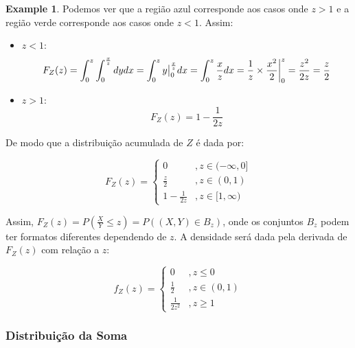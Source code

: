 \documentclass[
]{article}
\providecommand{\tightlist}{%
  \setlength{\itemsep}{0pt}\setlength{\parskip}{0pt}}
\theoremstyle{definition}
\theoremstyle{definition}
\newtheorem{example}{Example}[section]
\theoremstyle{definition}
\theoremstyle{definition}
\theoremstyle{remark}
\begin{document}
\begin{example}
Podemos ver que a região azul corresponde aos casos onde \(z > 1\) e a região verde corresponde aos casos onde \(z < 1\). Assim:

\begin{itemize}
\tightlist
\item
  \(z<1\): \begin{equation*}F_{Z}(z) = \int_{0}^{z}\int_{0}^{\frac{x}{z}}dydx = \int_{0}^{z}y\big{|}_{0}^{\frac{x}{z}}dx = \int_{0}^{z}\frac{x}{z}dx = \frac{1}{z} \times \frac{x^{2}}{2}\bigg{|}_{0}^{z} = \frac{z^{2}}{2z} = \frac{z}{2}\end{equation*}
\item
  \(z>1\): \begin{equation*}F_{Z}(z) = 1 - \frac{1}{2z}\end{equation*}
\end{itemize}

De modo que a distribuição acumulada de \(Z\) é dada por:

\begin{equation*}
F_{Z}(z) = \begin{cases}
0 & ,z \in (-\infty,0] \\
\frac{z}{2} & ,z \in (0,1) \\
1-\frac{1}{2z} & ,z \in [1,\infty)
\end{cases}
\end{equation*}

Assim, \(F_{Z}(z) = P\left(\frac{X}{Y} \le z \right) = P((X,Y) \in B_{z})\), onde os conjuntos \(B_{z}\) podem ter formatos diferentes dependendo de \(z\). A densidade será dada pela derivada de \(F_{Z}(z)\) com relação a \(z\):

\begin{equation*}
f_{Z}(z) = \begin{cases}
0 & ,z \le 0 \\
\frac{1}{2} & ,z \in (0,1) \\
\frac{1}{2z^{2}} & ,z \ge 1
\end{cases}
\end{equation*}
\end{example}

\hypertarget{distribuiuxe7uxe3o-da-soma}{%
\subsubsection{Distribuição da Soma}\label{distribuiuxe7uxe3o-da-soma}}
\end{document}
